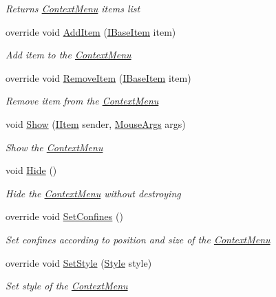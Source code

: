 \begin{DoxyCompactItemize}
\begin{DoxyCompactList}\small\item\em Returns \mbox{\hyperlink{class_space_v_i_l_1_1_context_menu}{Context\+Menu}} items list \end{DoxyCompactList}\item 
override void \mbox{\hyperlink{class_space_v_i_l_1_1_context_menu_a17241424bae3270513087c3adaef5b2e}{Add\+Item}} (\mbox{\hyperlink{interface_space_v_i_l_1_1_core_1_1_i_base_item}{I\+Base\+Item}} item)
\begin{DoxyCompactList}\small\item\em Add item to the \mbox{\hyperlink{class_space_v_i_l_1_1_context_menu}{Context\+Menu}} \end{DoxyCompactList}\item 
override void \mbox{\hyperlink{class_space_v_i_l_1_1_context_menu_a35bae3cc791ba6de129af36ddb0fb63b}{Remove\+Item}} (\mbox{\hyperlink{interface_space_v_i_l_1_1_core_1_1_i_base_item}{I\+Base\+Item}} item)
\begin{DoxyCompactList}\small\item\em Remove item from the \mbox{\hyperlink{class_space_v_i_l_1_1_context_menu}{Context\+Menu}} \end{DoxyCompactList}\item 
void \mbox{\hyperlink{class_space_v_i_l_1_1_context_menu_a732b019d164e73d1fb165a2e1c065a50}{Show}} (\mbox{\hyperlink{interface_space_v_i_l_1_1_core_1_1_i_item}{I\+Item}} sender, \mbox{\hyperlink{class_space_v_i_l_1_1_core_1_1_mouse_args}{Mouse\+Args}} args)
\begin{DoxyCompactList}\small\item\em Show the \mbox{\hyperlink{class_space_v_i_l_1_1_context_menu}{Context\+Menu}} \end{DoxyCompactList}\item 
void \mbox{\hyperlink{class_space_v_i_l_1_1_context_menu_afad2d14b827ab4b008f2beeaefd2aca7}{Hide}} ()
\begin{DoxyCompactList}\small\item\em Hide the \mbox{\hyperlink{class_space_v_i_l_1_1_context_menu}{Context\+Menu}} without destroying \end{DoxyCompactList}\item 
override void \mbox{\hyperlink{class_space_v_i_l_1_1_context_menu_ae8eaad3b3f7858ab1d03f5a18d94e4ca}{Set\+Confines}} ()
\begin{DoxyCompactList}\small\item\em Set confines according to position and size of the \mbox{\hyperlink{class_space_v_i_l_1_1_context_menu}{Context\+Menu}} \end{DoxyCompactList}\item 
override void \mbox{\hyperlink{class_space_v_i_l_1_1_context_menu_a92517e2e7ef73ccdadfa5b4016af403b}{Set\+Style}} (\mbox{\hyperlink{class_space_v_i_l_1_1_decorations_1_1_style}{Style}} style)
\begin{DoxyCompactList}\small\item\em Set style of the \mbox{\hyperlink{class_space_v_i_l_1_1_context_menu}{Context\+Menu}} \end{DoxyCompactList}\end{DoxyCompactItemize}
